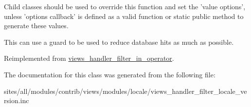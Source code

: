 Child classes should be used to override this function and set the 'value options', unless 'options callback' is defined as a valid function or static public method to generate these values.

This can use a guard to be used to reduce database hits as much as possible. 

Reimplemented from \hyperlink{classviews__handler__filter__in__operator_a5b5df6d90f4359ed28c0c446bdc81a6}{views\_\-handler\_\-filter\_\-in\_\-operator}.

The documentation for this class was generated from the following file:\begin{CompactItemize}
\item 
sites/all/modules/contrib/views/modules/locale/views\_\-handler\_\-filter\_\-locale\_\-version.inc\end{CompactItemize}
